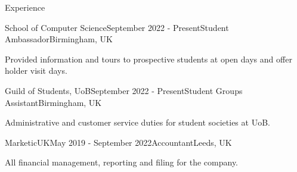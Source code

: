 \documentclass{resume} %
\begin{document}



\begin{rSection}{Experience}


\begin{rSubsection}{School of Computer Science}{September 2022 - Present}{Student Ambassador}{Birmingham, UK}
\item  Provided information and tours to prospective students at open days and offer holder visit days. 
\end{rSubsection}


\begin{rSubsection}{Guild of Students, UoB}{September 2022 - Present}{Student Groups Assistant}{Birmingham, UK}
\item Administrative and customer service duties for student societies at UoB.
\end{rSubsection}


\begin{rSubsection}{MarketicUK}{May 2019 - September 2022}{Accountant}{Leeds, UK}
\item All financial management, reporting and filing for the company. 
\end{rSubsection}


\end{rSection}


\end{document}
